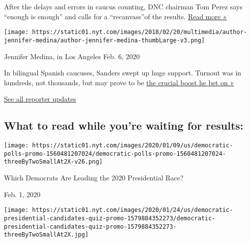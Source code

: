 After the delays and errors in caucus counting, DNC chairman Tom Perez
says ``enough is enough'' and calls for a ``recanvass''of the results.
\href{https://www.nytimes.com/live/2020/iowa-caucus-nh-primary-02-06?action=click\&module=ELEX_results\&pgtype=Interactive\&region=ReporterUpdates\#tom-perez-iowa}{Read
more »}

\texttt{[image: https://static01.nyt.com/images/2018/02/20/multimedia/author-jennifer-medina/author-jennifer-medina-thumbLarge-v3.png]}

Jennifer Medina, in Los Angeles Feb. 6, 2020

In bilingual Spanish caucuses, Sanders swept up huge support. Turnout
was in hundreds, not thousands, but may prove to be
\href{https://www.nytimes.com/article/latinos-iowa-caucus.html?action=click\&module=ELEX_results\&pgtype=Interactive\&region=ReporterUpdates}{the
crucial boost he bet on »}

\href{https://www.nytimes.com/interactive/2020/02/03/us/elections/results-iowa-caucus-live-updates.html?action=click\&module=ELEX_results\&pgtype=Interactive\&region=Component}{See
all reporter updates}

\hypertarget{what-to-read-while-youre-waiting-for-results}{%
\subsection{What to read while you're waiting for
results:}\label{what-to-read-while-youre-waiting-for-results}}

\href{https://www.nytimes.com/interactive/2020/us/elections/democratic-polls.html?action=click\&module=ELEX_results\&pgtype=Interactive\&region=RelatedCoverage}{}

\texttt{[image: https://static01.nyt.com/images/2020/01/09/us/democratic-polls-promo-1560481207024/democratic-polls-promo-1560481207024-threeByTwoSmallAt2X-v26.png]}

Which Democrats Are Leading the 2020 Presidential Race?

Feb. 1, 2020

\href{https://www.nytimes.com/interactive/2020/01/30/us/politics/democratic-presidential-candidates-quiz.html?action=click\&module=ELEX_results\&pgtype=Interactive\&region=RelatedCoverage}{}

\texttt{[image: https://static01.nyt.com/images/2020/01/24/us/democratic-presidential-candidates-quiz-promo-1579884352273/democratic-presidential-candidates-quiz-promo-1579884352273-threeByTwoSmallAt2X.jpg]}

